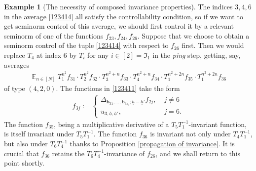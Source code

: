\documentclass[11pt]{amsart}
\theoremstyle{definition}
\newtheorem{example}{Example}
\newcommand{\FI}{{\mathfrak I}}
\renewcommand{\b}{{\textbf{b}}}
\newcommand{\uh}{{\underline{h}}}
\newcommand{\inv}{^{-1}}
\DeclareMathOperator*{\E}{\mathbb{E}}
\begin{document}
\begin{example}[The necessity of composed invariance properties]
The indices $3, 4, 6$ in the average \eqref{123414} all satisfy the controllability condition, so if we want to get seminorm control of this average, we should first control it by a relevant seminorm of one of the functions $f_{23}, f_{24}, f_{26}$. Suppose that we choose to obtain a seminorm control of the tuple \eqref{123414} with respect to $f_{26}$ first.
Then we would replace $T_4$ at index 6 by $T_i$ for any $i\in[2] = \FI_1$ in the \textit{ping} step, getting, say, averages
\begin{align}\label{123411}
    \E_{n\in[N]}T_1^{n^2}f_{31} \cdot T_2^{n^2}f_{32}\cdot T_3^{n^2+n}f_{33}\cdot T_4^{n^2+n}f_{34} \cdot T_1^{n^2+2n}f_{35}\cdot T_1^{n^2+2n}f_{36}
\end{align}
of type $(4, 2, 0)$. The functions in \eqref{123411} take the form
\begin{align*}
    f_{3j} := \begin{cases}
    \Delta_{\b_{31}, \ldots, \b_{3s_3}; \uh-\uh'}f_{2j},\; & j \neq 6\\
    u_{3,\uh, \uh'},\; &j=6.
    \end{cases}
\end{align*}
The function $f_{35}$, being a multiplicative derivative of a $T_5 T_1\inv$-invariant function, is itself invariant under $T_5 T_1\inv$. The function $f_{36}$ is invariant not only under $T_4T_1\inv$, but also under $T_6 T_4\inv$ thanks to Proposition \ref{propagation of invariance}. It is crucial that  $f_{36}$ retains the $T_6 T_4\inv$-invariance of $f_{26}$, and we shall return to this point shortly.


\end{example}
\end{document}
